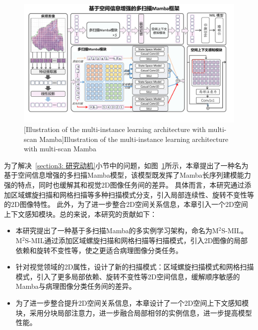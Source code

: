 \begin{figure}[h]
  \centering
  \includegraphics[width=\columnwidth]{figures/MMSMIL.pdf}
  [Illustration of the multi-instance learning architecture with multi-scan Mamba]{Illustration of the multi-instance learning architecture with multi-scan Mamba}
  \vspace{-10pt}
  \label{figure3: 多扫描Mamba}
  \end{figure}

为了解决~\ref{section3: 研究动机}小节中的问题，如图~\ref{figure3: 多扫描Mamba}所示，本章提出了一种名为基于空间信息增强的多扫描Mamba模型，该模型既发挥了Mamba长序列建模能力强的特点，同时也缓解其和视觉2D图像任务间的差异。
具体而言，本研究通过添加区域螺旋扫描和网格扫描等多种扫描模式分支，引入局部连续性、旋转不变性等的2D图像特性。
此外，为了进一步整合2D空间关系信息，本章引入一个2D空间上下文感知模块。总的来说，本研究的贡献如下：
\begin{itemize}
 \item 本研究提出了一种基于多扫描Mamba的多实例学习架构，命名为M$^2$S-MIL。M$^2$S-MIL通过添加区域螺旋扫描和网格扫描等扫描模式，引入2D图像的局部依赖和旋转不变性等，使之更适合病理图像分类任务。
 \item	针对视觉领域的2D属性，设计了新的扫描模式：区域螺旋扫描模式和网格扫描模式，引入了更多局部依赖、旋转不变性等2D空间信息，缓解顺序敏感的Mamba与病理图像分类任务间的差异。
 \item	为了进一步整合提升2D空间关系信息，本章设计了一个2D空间上下文感知模块，采用分块局部注意力，进一步融合局部相邻的实例信息，进一步提高模型性能。
\end{itemize}

